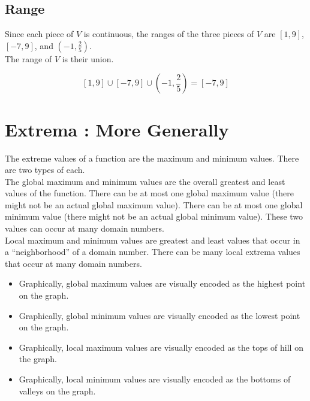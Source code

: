 \documentclass{ximera}
\begin{document}
\subsection*{Range} 


Since each piece of $V$ is continuous, the ranges of the three pieces of $V$ are $[1, 9]$, $[-7, 9]$, and $\left( -1, \frac{2}{5} \right)$. \\

The range of $V$ is their union.

\[
[1, 9] \cup [-7, 9] \cup \left( -1, \frac{2}{5} \right) = [-7, 9]
\]













\section*{Extrema : More Generally}


The extreme values of a function are the maximum and minimum values.  There are two types of each. \\

The global maximum and minimum values are the overall greatest and least values of the function.  There can be at most one global maximum value (there might not be an actual global maximum value). There can be at most one global minimum value (there might not be an actual global minimum value).  These two values can occur at many domain numbers.\\


Local maximum and minimum values are greatest and least values that occur in a ``neighborhood'' of a domain number.  There can be many local extrema values that occur at many domain numbers. \\


\begin{itemize}
\item Graphically, global maximum values are visually encoded as the highest point on the graph.
\item Graphically, global minimum values are visually encoded as the lowest point on the graph.
\item Graphically, local maximum values are visually encoded as the tops of hill on the graph.
\item Graphically, local minimum values are visually encoded as the bottoms of valleys on the graph.
\end{itemize}
\end{document}
